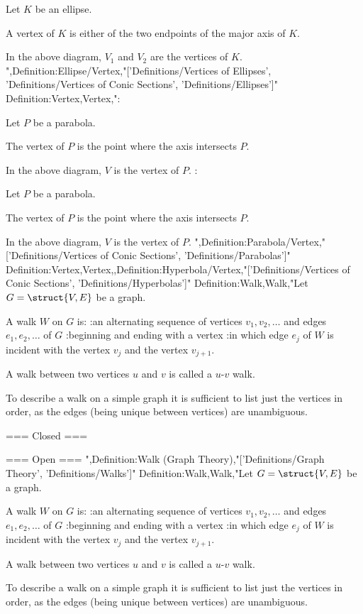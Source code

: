 Let $K$ be an ellipse.

A vertex of $K$ is either of the two endpoints of the major axis of $K$.


In the above diagram, $V_1$ and $V_2$ are the vertices of $K$.
",Definition:Ellipse/Vertex,"['Definitions/Vertices of Ellipses', 'Definitions/Vertices of Conic Sections', 'Definitions/Ellipses']"
Definition:Vertex,Vertex,":


Let $P$ be a parabola.

The vertex of $P$ is the point where the axis intersects $P$.


In the above diagram, $V$ is the vertex of $P$.
:


Let $P$ be a parabola.

The vertex of $P$ is the point where the axis intersects $P$.


In the above diagram, $V$ is the vertex of $P$.
",Definition:Parabola/Vertex,"['Definitions/Vertices of Conic Sections', 'Definitions/Parabolas']"
Definition:Vertex,Vertex,,Definition:Hyperbola/Vertex,"['Definitions/Vertices of Conic Sections', 'Definitions/Hyperbolas']"
Definition:Walk,Walk,"Let $G = \struct {V, E}$ be a graph.

A walk $W$ on $G$ is:
:an alternating sequence of vertices $v_1, v_2, \ldots$ and edges $e_1, e_2, \ldots$ of $G$
:beginning and ending with a vertex
:in which edge $e_j$ of $W$ is incident with the vertex $v_j$ and the vertex $v_{j + 1}$.


A walk between two vertices $u$ and $v$ is called a $u$-$v$ walk.


To describe a walk on a simple graph it is sufficient to list just the vertices in order, as the edges (being unique between vertices) are unambiguous.


=== Closed ===

=== Open ===
",Definition:Walk (Graph Theory),"['Definitions/Graph Theory', 'Definitions/Walks']"
Definition:Walk,Walk,"Let $G = \struct {V, E}$ be a graph.

A walk $W$ on $G$ is:
:an alternating sequence of vertices $v_1, v_2, \ldots$ and edges $e_1, e_2, \ldots$ of $G$
:beginning and ending with a vertex
:in which edge $e_j$ of $W$ is incident with the vertex $v_j$ and the vertex $v_{j + 1}$.


A walk between two vertices $u$ and $v$ is called a $u$-$v$ walk.


To describe a walk on a simple graph it is sufficient to list just the vertices in order, as the edges (being unique between vertices) are unambiguous.


